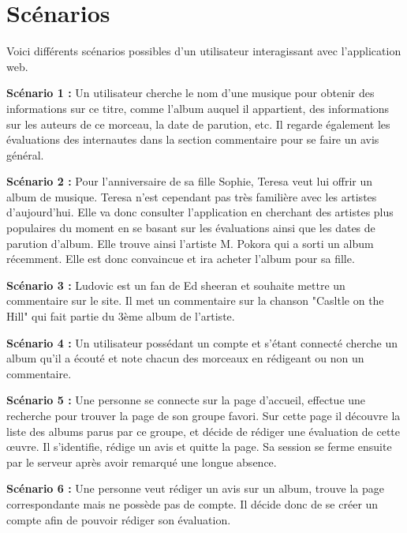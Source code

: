 \section{Scénarios}

    \begin{paragraphe}
        Voici différents scénarios possibles d'un utilisateur interagissant avec
        l'application web.
    \end{paragraphe}

    \begin{paragraphe}
        \textbf{Scénario 1 :}
        Un utilisateur cherche le nom d'une musique pour obtenir des informations
        sur ce titre, comme l'album auquel il appartient, des informations sur les
        auteurs de ce morceau, la date de parution, etc. Il regarde également les évaluations
        des internautes dans la section commentaire pour se faire un avis général.
    \end{paragraphe}

    \begin{paragraphe}
        \textbf{Scénario 2 :}
        Pour l'anniversaire de sa fille Sophie, Teresa veut lui offrir un album de
        musique. Teresa n'est cependant pas très familière avec les artistes
        d'aujourd'hui. Elle va donc consulter l'application en cherchant des
        artistes plus populaires du moment en se basant sur les évaluations ainsi que les dates de parution d'album. 
        Elle trouve ainsi l'artiste M. Pokora qui a sorti un album récemment. Elle est donc convaincue et ira
        acheter l'album pour sa fille.
    \end{paragraphe}

    \begin{paragraphe}
        \textbf{Scénario 3 :}
        Ludovic est un fan de Ed sheeran et souhaite mettre un commentaire sur le
        site.
        Il met un commentaire sur la chanson "Casltle on the Hill" qui fait partie
        du 3ème album de l'artiste.
    \end{paragraphe}

    \begin{paragraphe}
        \textbf{Scénario 4 :}
        Un utilisateur possédant un compte et s'étant connecté cherche un album qu'il
        a écouté et note chacun des morceaux en rédigeant ou non un commentaire.
    \end{paragraphe}

    \begin{paragraphe}
        \textbf{Scénario 5 :}
        Une personne se connecte sur la page d’accueil, effectue une recherche pour
        trouver la page de son groupe favori. Sur cette page il découvre la liste
        des albums parus par ce groupe, et décide de rédiger une évaluation de cette
        œuvre. Il s’identifie, rédige un avis et quitte la page. Sa session se
        ferme ensuite par le serveur après avoir remarqué une longue absence.
    \end{paragraphe}

    \begin{paragraphe}
        \textbf{Scénario 6 :}
        Une personne veut rédiger un avis sur un album, trouve la page
        correspondante mais ne possède pas de compte. Il décide donc de se créer un
        compte afin de pouvoir rédiger son évaluation.
    \end{paragraphe}
